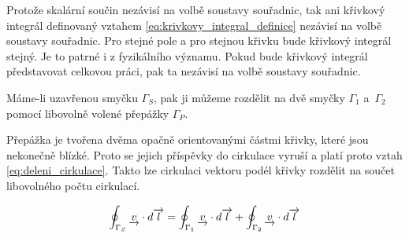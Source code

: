 Protože skalární součin nezávisí na volbě soustavy souřadnic, tak ani křivkový integrál definovaný vztahem \eqref{eq:krivkovy_integral_definice} nezávisí na volbě soustavy souřadnic. Pro stejné pole a pro stejnou křivku bude křivkový integrál stejný. Je to patrné i z fyzikálního významu. Pokud bude křivkový integrál představovat celkovou práci, pak ta nezávisí na volbě soustavy souřadnic.

Máme-li uzavřenou smyčku \(\Gamma_S\), pak ji můžeme rozdělit na dvě smyčky \(\Gamma_1\) a~\(\Gamma_2\) pomocí libovolně volené přepážky \(\Gamma_P\).


Přepážka je tvořena dvěma opačně orientovanými částmi křivky, které jsou nekonečně blízké. Proto se jejich příspěvky do cirkulace vyruší a platí proto vztah \eqref{eq:deleni_cirkulace}. Takto lze cirkulaci vektoru podél křivky rozdělit na součet libovolného počtu cirkulací.

\begin{equation}
\label{eq:deleni_cirkulace}
\begin{split}
\oint_{\Gamma_S} \underrightarrow{v} \cdot d\overrightarrow{l} = \oint_{\Gamma_1} \underrightarrow{v} \cdot d\overrightarrow{l} + \oint_{\Gamma_2} \underrightarrow{v} \cdot d\overrightarrow{l}
\end{split}
\end{equation}

